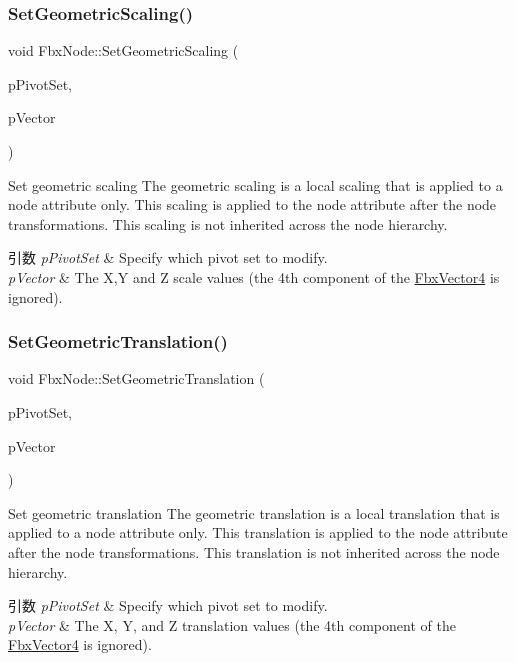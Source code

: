 \subsubsection{\texorpdfstring{Set\+Geometric\+Scaling()}{SetGeometricScaling()}}
{\footnotesize\ttfamily void Fbx\+Node\+::\+Set\+Geometric\+Scaling (\begin{DoxyParamCaption}\item[{\hyperlink{class_fbx_node_ae62b7311ac4727654cdf1ebd5cbf7343}{E\+Pivot\+Set}}]{p\+Pivot\+Set,  }\item[{\hyperlink{class_fbx_vector4}{Fbx\+Vector4}}]{p\+Vector }\end{DoxyParamCaption})}

Set geometric scaling The geometric scaling is a local scaling that is applied to a node attribute only. This scaling is applied to the node attribute after the node transformations. This scaling is not inherited across the node hierarchy. 
\begin{DoxyParams}{引数}
{\em p\+Pivot\+Set} & Specify which pivot set to modify. \\
\hline
{\em p\+Vector} & The X,Y and Z scale values (the 4th component of the \hyperlink{class_fbx_vector4}{Fbx\+Vector4} is ignored). \\
\hline
\end{DoxyParams}
\mbox{\label{class_fbx_node_a5aaf6f4c2b4ffcd1b483d84453634e79}} 
\subsubsection{\texorpdfstring{Set\+Geometric\+Translation()}{SetGeometricTranslation()}}
{\footnotesize\ttfamily void Fbx\+Node\+::\+Set\+Geometric\+Translation (\begin{DoxyParamCaption}\item[{\hyperlink{class_fbx_node_ae62b7311ac4727654cdf1ebd5cbf7343}{E\+Pivot\+Set}}]{p\+Pivot\+Set,  }\item[{\hyperlink{class_fbx_vector4}{Fbx\+Vector4}}]{p\+Vector }\end{DoxyParamCaption})}

Set geometric translation The geometric translation is a local translation that is applied to a node attribute only. This translation is applied to the node attribute after the node transformations. This translation is not inherited across the node hierarchy. 
\begin{DoxyParams}{引数}
{\em p\+Pivot\+Set} & Specify which pivot set to modify. \\
\hline
{\em p\+Vector} & The X, Y, and Z translation values (the 4th component of the \hyperlink{class_fbx_vector4}{Fbx\+Vector4} is ignored). \\
\hline
\end{DoxyParams}
\mbox{\label{class_fbx_node_afa13e04c7407a2aefc0cde6706a39541}} 
